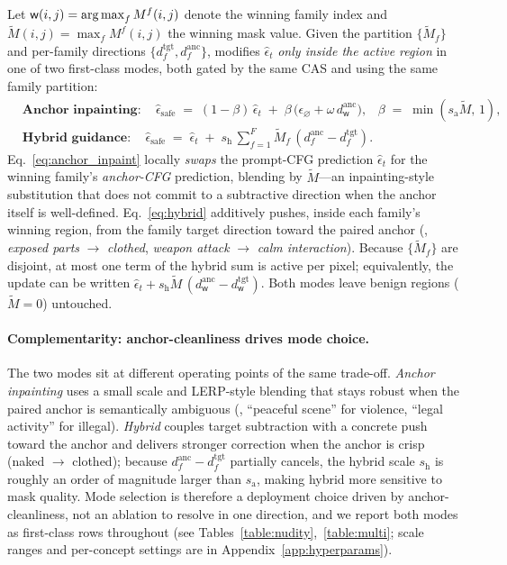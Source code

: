 Let $\mathsf{w}(i,j) = \operatorname*{arg\,max}_{f} M^{f}(i,j)$ denote the winning family index and $\widetilde{M}(i,j) = \max_{f} M^{f}(i,j)$ the winning mask value. Given the partition $\{\widetilde{M}_f\}$ and per-family directions $\{d^{\text{tgt}}_f, d^{\text{anc}}_f\}$, \ours{} modifies $\hat{\epsilon}_t$ \emph{only inside the active region} in one of two first-class modes, both gated by the same CAS and using the same family partition:
\begin{align}
    &\textbf{Anchor inpainting}:\quad
    \hat{\epsilon}_{\text{safe}} \;=\; (1-\beta)\,\hat{\epsilon}_t \;+\; \beta\,\big(\epsilon_\varnothing + \omega\,d^{\text{anc}}_{\mathsf{w}}\big),
    \;\;\; \beta \;=\; \min(s_{\text{a}}\widetilde{M},\,1),
    \label{eq:anchor_inpaint}\\[2pt]
    &\textbf{Hybrid guidance}:\quad
    \hat{\epsilon}_{\text{safe}} \;=\; \hat{\epsilon}_t \;+\; s_{\text{h}}\,\textstyle\sum_{f=1}^{F} \widetilde{M}_f\,(d^{\text{anc}}_f - d^{\text{tgt}}_f).
    \label{eq:hybrid}
\end{align}
Eq.~\ref{eq:anchor_inpaint} locally \emph{swaps} the prompt-CFG prediction $\hat{\epsilon}_t$ for the winning family's \emph{anchor-CFG} prediction, blending by $\widetilde{M}$---an inpainting-style substitution that does not commit to a subtractive direction when the anchor itself is well-defined. Eq.~\ref{eq:hybrid} additively pushes, inside each family's winning region, from the family target direction toward the paired anchor (\eg, \textit{exposed parts} $\to$ \textit{clothed}, \textit{weapon attack} $\to$ \textit{calm interaction}). Because $\{\widetilde{M}_f\}$ are disjoint, at most one term of the hybrid sum is active per pixel; equivalently, the update can be written $\hat{\epsilon}_t + s_{\text{h}}\widetilde{M}\,(d^{\text{anc}}_{\mathsf{w}} - d^{\text{tgt}}_{\mathsf{w}})$. Both modes leave benign regions ($\widetilde{M}{=}0$) untouched.

\paragraph{Complementarity: anchor-cleanliness drives mode choice.}
The two modes sit at different operating points of the same trade-off. \emph{Anchor inpainting} uses a small scale and LERP-style blending that stays robust when the paired anchor is semantically ambiguous (\eg, ``peaceful scene'' for violence, ``legal activity'' for illegal). \emph{Hybrid} couples target subtraction with a concrete push toward the anchor and delivers stronger correction when the anchor is crisp (naked $\to$ clothed); because $d^{\text{anc}}_f - d^{\text{tgt}}_f$ partially cancels, the hybrid scale $s_{\text{h}}$ is roughly an order of magnitude larger than $s_{\text{a}}$, making hybrid more sensitive to mask quality. Mode selection is therefore a deployment choice driven by anchor-cleanliness, not an ablation to resolve in one direction, and we report both modes as first-class rows throughout (see Tables~\ref{table:nudity},~\ref{table:multi}; scale ranges and per-concept settings are in Appendix~\ref{app:hyperparams}).

